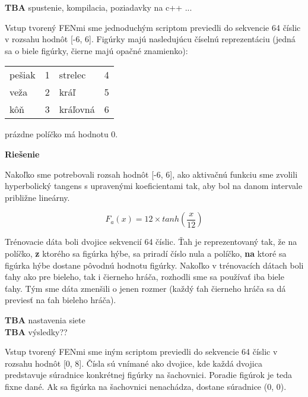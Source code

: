 \documentclass[12pt]{article}
\newcommand{\mysmallsection}[1]{\vspace{0.5cm}{\centering\large\textbf{#1}\\}\normalsize\vspace{0.5cm}}
\begin{document}
\textbf{TBA} spustenie, kompilacia, poziadavky na c++ ...

\mysmallsection{Prístup 1}

Vstup tvorený FENmi sme jednoduchým scriptom previedli do sekvencie 64 číslic v rozsahu hodnôt [-6, 6]. Figúrky majú nasledujúcu číselnú reprezentáciu (jedná sa o biele figúrky, čierne majú opačné znamienko):

\begin{center}
{\small
\hspace*{-1cm}\begin{tabular}{| l l | l l |}
\hline
 pešiak & 1 & strelec & 4 \\
 veža & 2 & kráľ & 5 \\
 kôň & 3 & kráľovná & 6\\
\hline
\end{tabular}
}
\end{center}

prázdne políčko má hodnotu 0.

{\centering\textbf{Riešenie}\\}

Nakoľko sme potrebovali rozsah hodnôt [-6, 6], ako aktivačnú funkciu sme zvolili hyperbolický tangens s upravenými koeficientami tak, aby bol na danom intervale približne lineárny. 

\begin{equation}
F_a(x)=12 \times tanh(\frac{x}{12})
\end{equation}

Trénovacie dáta boli dvojice sekvencií 64 číslic. Ťah je reprezentovaný tak, že na políčko, \textbf{z} ktorého sa figúrka hýbe, sa priradí číslo nula a políčko, \textbf{na} ktoré sa figúrka hýbe dostane pôvodnú hodnotu figúrky. Nakoľko v trénovacích dátach boli ťahy ako pre bieleho, tak i čierneho hráča, rozhodli sme sa používať iba biele ťahy. Tým sme dáta zmenšili o jenen rozmer (každý ťah čierneho hráča sa dá previesť na ťah bieleho hráča).

\textbf{TBA} nastavenia siete\\
\textbf{TBA} výsledky??

\mysmallsection{Prístup 2}

Vstup tvorený FENmi sme iným scriptom previedli do sekvencie 64 číslic v rozsahu hodnôt [0, 8]. Čísla sú vnímané ako dvojice, kde každá dvojica predstavuje súradnice konkrétnej figúrky na šachovnici. Poradie figúrok je teda fixne dané. Ak sa figúrka na šachovnici nenachádza, dostane súradnice (0, 0).
\end{document}
